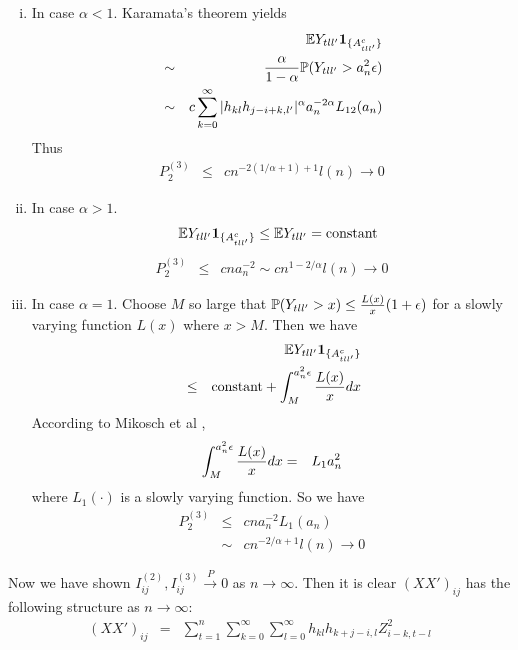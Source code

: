 \documentclass{article}
\begin{document}
\begin{enumerate}[i)]
\item In case $\alpha < 1$. Karamata's theorem yields
  \begin{eqnarray*}
    && \mathbb{E} Y_{tll'}\mathbf{1}_{\{A^c_{tll'}\}} \\
    &\sim& {\alpha \over 1 -\alpha} \mathbb{P}(Y_{tll'} > a_n^2 \epsilon) \\
    &\sim& c \sum_{k=0}^\infty |h_{kl}h_{j-i+k,l'}|^{\alpha}
           a_n^{-2\alpha} L_{12}(a_n) \\
  \end{eqnarray*}
  Thus
  \begin{eqnarray*}
    P^{(3)}_2 &\leq& c n^{-2(1/\alpha + 1)+1}l(n) \to 0
  \end{eqnarray*}

\item In case $\alpha > 1$. 
  \begin{eqnarray*}
    && \mathbb{E} Y_{tll'} \mathbf{1}_{\{A^c_{tll'}\}} \leq \mathbb{E} Y_{tll'} = \text{constant}
  \end{eqnarray*}
  \begin{eqnarray*}
    P^{(3)}_2 &\leq& cna_n^{-2} \sim c n^{1-2/\alpha} l(n) \to 0
  \end{eqnarray*}
\item In case $\alpha=1$.
  Choose $M$ so large that $\mathbb{P}(Y_{tll'} > x) \leq {L(x) \over x}
  (1 + \epsilon)$ for a slowly varying function $L(x)$
  where $x > M$. Then we have
  \begin{eqnarray*}
    && \mathbb{E} Y_{tll'} \mathbf{1}_{\{A^c_{tll'}\}} \\
    &\leq& \text{constant} + \int_{M}^{a_n^2 \epsilon}
           {L(x) \over x} dx
  \end{eqnarray*}
  According to Mikosch et al \cite{Embrechts1997},
  \begin{eqnarray*}
    \int_{M}^{a_n^2 \epsilon}
    {L(x) \over x} dx &=& L_1{a_n^2}
  \end{eqnarray*}
  where $L_1(\cdot)$ is a slowly varying function. So we have
  \begin{eqnarray*}
    P^{(3)}_2 &\leq& c n a_n^{-2} L_1(a_n)\\
    &\sim& c n^{-2/\alpha + 1} l(n) \to 0
  \end{eqnarray*}
\end{enumerate}
Now we have shown $I^{(2)}_{ij}, I^{(3)}_{ij} \xrightarrow{P} 0$ as $n
\to \infty$. Then it is clear $(XX')_{ij}$ has the following structure
as $n \to \infty$:
\begin{eqnarray*}
  (XX')_{ij} &=& \sum_{t=1}^n \sum_{k=0}^\infty \sum_{l=0}^\infty
  h_{kl} h_{k+j-i,l} Z_{i-k, t-l}^2
\end{eqnarray*}
\end{document}
